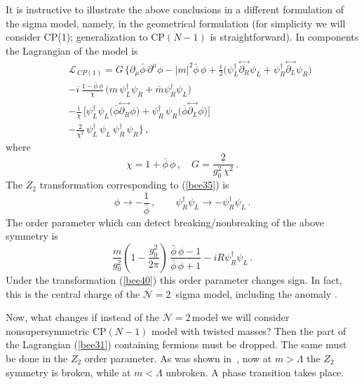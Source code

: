 \documentclass[epsfig,12pt]{article}
\def\beq{\begin{equation}}
\def\eeq{\end{equation}}
\def\beqn{\begin{eqnarray}}
\def\eeqn{\end{eqnarray}}
\newcommand{\ntwo}{${\mathcal N}=2\,$}
\def\beqn{\begin{eqnarray}}
\def\eeqn{\end{eqnarray}}
\def\beq{\begin{equation}}
\def\eeq{\end{equation}}
\begin{document}
It is instructive to illustrate the above conclusions
in a different formulation of the sigma model, namely, in the geometrical formulation
(for simplicity we will consider CP(1); generalization to CP$(N-1)$ is straightforward).
In components the Lagrangian of the model is
\beqn
&&
{\mathcal L}_{\,  CP(1)}= G\, \Big\{
\partial_\mu \bar{\phi}\, \partial^\mu\phi -|m|^2{\bar{\phi}\,\phi} 
+\frac{i}{2}\big(\psi_L^\dagger\!\stackrel{\leftrightarrow}{\partial_R}\!\psi_L 
+ \psi_R^\dagger\!\stackrel{\leftrightarrow}{\partial_L}\!\psi_R
\big)
\nonumber\\[1mm] 
&&
-i\,\frac{1-\bar{\phi}\,\phi}{\chi} \,\big(m\,\psi_L^\dagger \psi_R + \bar m
\psi_R^\dagger \psi_L
\big)
\nonumber\\[1mm] 
&&
-\frac{i}{\chi}\,  \big[\psi_L^\dagger \psi_L
\big(\bar{\phi} \!\stackrel{\leftrightarrow}{\partial_R}\!\phi
\big)+ \psi_R^\dagger\, \psi_R
\big(\bar{\phi}\!\stackrel{\leftrightarrow}{\partial_L}\!\phi
\big)
\big]
\nonumber\\[1mm]
&&
-
\frac{2}{\chi^2}\,\psi_L^\dagger\,\psi_L \,\psi_R^\dagger\,\psi_R
\Big\}\,,
\label{Aone}
\eeqn
where 
\beq
\chi = 1+\bar{\phi}\,\phi\,,\quad G= \frac{2}{g_0^2\,\chi^2}\,.
\eeq
The $Z_2$ transformation corresponding to (\ref{bee35}) is
\beq
\phi \to -\frac{1}{\bar{\phi}}\,,\qquad \psi_R^\dagger \psi_L\to -
\psi_R^\dagger \psi_L\,.
\label{bee40}
\eeq
 The order parameter which can detect breaking/nonbreaking of the above
symmetry is
\beq
\frac{m}{g_0^2} \left(1- \frac{g_0^2}{2\pi}
\right)\, \frac{\bar{\phi}\,\phi-1}{\bar{\phi}\,\phi+1} - 
i R \psi_R^\dagger \psi_L\,.
\eeq
Under the transformation (\ref{bee40}) this order parameter changes sign.
In fact, this is  the central charge of the \ntwo
sigma model, including the anomaly  \cite{svz}.

Now, what changes if instead of the \ntwo model we will consider nonsupersymmetric 
CP$(N-1)$ model with twisted masses? Then the part of the Lagrangian (\ref{bee31}) containing fermions must be dropped. The same must be done in the $Z_2$ order parameter.
As was shown in~\cite{GSY05,GSYphtr}, now at $m>\Lambda$ the $Z_2$ symmetry is broken, while at $m<\Lambda$ unbroken. A phase transition takes place.





\newpage
\vspace{2.5cm}
\end{document}
